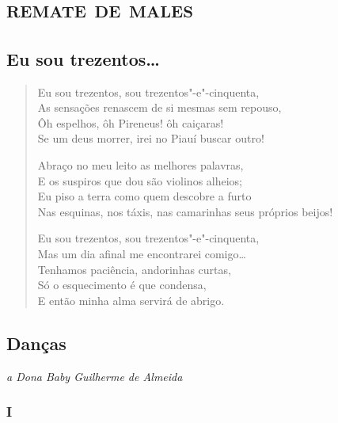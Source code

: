 \part{\textsc{remate de males}}
\removeepigraph


\chapter[Eu sou trezentos\ldots{}]{Eu sou trezentos\ldots{} }

\begin{verse}
Eu sou trezentos, sou trezentos"-e"-cinquenta,\\
As sensações renascem de si mesmas sem repouso,\\
Ôh espelhos, ôh Pireneus! ôh caiçaras!\\
Se um deus morrer, irei no Piauí buscar outro!

Abraço no meu leito as melhores palavras,\\
E os suspiros que dou são violinos alheios;\\
Eu piso a terra como quem descobre a furto\\
Nas esquinas, nos táxis, nas camarinhas seus próprios beijos!

Eu sou trezentos, sou trezentos"-e"-cinquenta,\\
Mas um dia afinal me encontrarei comigo\ldots{}\\
Tenhamos paciência, andorinhas curtas,\\
Só o esquecimento é que condensa,\\
E então minha alma servirá de abrigo.
\end{verse}

\chapter[Danças]{Danças }


\begin{flushright}
\emph{a Dona Baby Guilherme de Almeida}
\end{flushright}

\section*{I}


